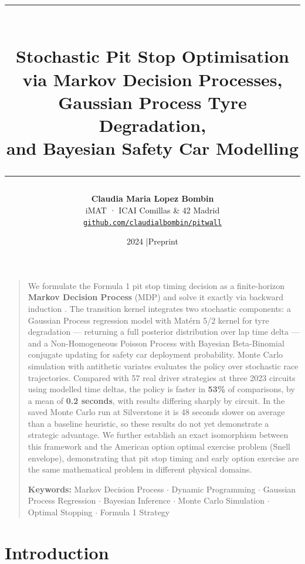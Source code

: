 \documentclass[11pt, a4paper, twocolumn]{article}
\title{
  \vspace{-1.2cm}
  {\color{pitred}\rule{\textwidth}{2pt}}\\[6pt]
  \textbf{\LARGE Stochastic Pit Stop Optimisation}\\[3pt]
  {\large via Markov Decision Processes, Gaussian Process Tyre Degradation,}\\[2pt]
  {\large and Bayesian Safety Car Modelling}\\[6pt]
  {\color{pitred}\rule{\textwidth}{0.5pt}}
}
\author{
  \textbf{Claudia Maria Lopez Bombin}\\
  {\small iMAT · ICAI Comillas \& 42 Madrid}\\
  {\small \href{https://github.com/claudialbombin/pitwall}{\texttt{github.com/claudialbombin/pitwall}}}
}
\date{\small 2024 \quad|\quad Preprint}
\renewenvironment{abstract}
  {\vspace{-4pt}\begin{quote}\small}
  {\end{quote}\vspace{4pt}}
\numberwithin{equation}{section}
\theoremstyle{definition}
\begin{document}

\maketitle
\thispagestyle{fancy}

\begin{abstract}
We formulate the Formula 1 pit stop timing decision as a finite-horizon
\textbf{Markov Decision Process} (MDP) and solve it exactly via backward induction
\cite{bellman1957}. The transition kernel integrates two stochastic components:
a Gaussian Process regression model with Mat\'{e}rn 5/2 kernel for tyre
degradation --- returning a full posterior distribution over lap time delta ---
and a Non-Homogeneous Poisson Process with Bayesian Beta-Binomial conjugate
updating for safety car deployment probability. Monte Carlo simulation with
antithetic variates evaluates the policy over stochastic race trajectories.
Compared with 57 real driver strategies at three 2023 circuits using modelled
time deltas, the policy is faster in \textbf{53\%} of comparisons, by a mean of
\textbf{0.2 seconds}, with results differing sharply by circuit. In the saved
Monte Carlo run at Silverstone it is 48 seconds slower on average than a baseline
heuristic, so these results do not yet demonstrate a strategic advantage. We further establish an exact
isomorphism between this framework and the American option optimal exercise
problem (Snell envelope), demonstrating that pit stop timing and early option
exercise are the same mathematical problem in different physical domains.

\medskip
\noindent\textbf{Keywords:} Markov Decision Process $\cdot$ Dynamic Programming
$\cdot$ Gaussian Process Regression $\cdot$ Bayesian Inference $\cdot$
Monte Carlo Simulation $\cdot$ Optimal Stopping $\cdot$ Formula 1 Strategy
\end{abstract}

\vspace{4pt}
\noindent{\color{pitgrey!60}\rule{\columnwidth}{0.25pt}}
\vspace{2pt}

\section{Introduction}
\end{document}
